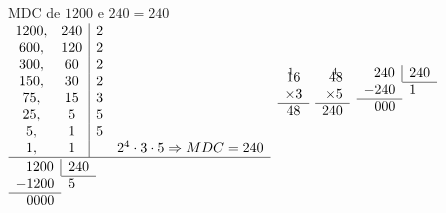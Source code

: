 \begin{enumerate}
	\begin{multicols}{4}
		\indent MDC de $1200$ e $240 = 240$\\
		$\begin{array}{cc|cc}
		1200, & 240 & 2 & \\ 
		600, & 120 & 2 & \\ 
		300, & 60 & 2 & \\
		150, & 30 & 2 & \\
		75, & 15 & 3 & \\
		25, & 5 & 5 & \\
		5, & 1 & 5 & \\
		1, & 1 &  & 2^4 \cdot 3 \cdot 5 \Rightarrow MDC = 240 \\
		\hline
		\end{array}$
		\large
		\columnbreak
		$
		\begin{array}{r l}
		\multicolumn{2}{c}{_{1}} \vspace*{-5.5pt} \\ 
		\multicolumn{2}{c}{16} \\ 
		\multicolumn{2}{c}{\times3} \\ \cline{1-2}
		\multicolumn{2}{c}{48}
		\end{array}
		$
		\large
		\columnbreak
		$
		\begin{array}{r l}
		\multicolumn{2}{r}{_{4}} \vspace*{-5.5pt} \\ 
		\multicolumn{2}{r}{48} \\ 
		\multicolumn{2}{r}{\times5} \\ \cline{1-2}
		\multicolumn{2}{r}{240} \\
		\end{array}
		$
		\columnbreak
		$
		\begin{array}{r l r r}
		\multicolumn{2}{r}{240} \vline & \multicolumn{2}{l}{240} \\ \cline{3-4}
		\multicolumn{2}{l}{-240} & \multicolumn{2}{l}{1} \\ \cline{1-2}
		\multicolumn{2}{r}{000} &  \\
		\end{array}
		$
		\columnbreak
		$
		\begin{array}{l l r r}
		\multicolumn{2}{r}{1200} \vline & \multicolumn{2}{l}{240} \\ \cline{3-4}
		\multicolumn{2}{l}{-1200} & \multicolumn{2}{l}{5} \\ \cline{1-2}
		\multicolumn{2}{r}{0000} &  \\
		\end{array}
		$
	\end{multicols}


\end{enumerate}
